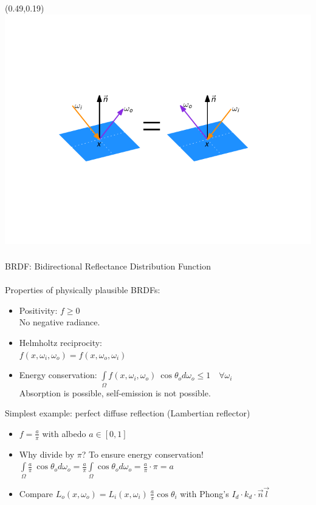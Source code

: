\documentclass[utf8,stillsansserifmath,fleqn,t]{beamer}
\begin{document}
\begin{frame}[label=radiometry-brdf]
\begin{textblock}{0.5}(0.49,0.19)\includegraphics[width=\textwidth]{./fig/helmholtz-reciprocity.pdf}\end{textblock}
\frametitle{\insertsection}
BRDF: Bidirectional Reflectance Distribution Function\\
~\\Properties of physically plausible BRDFs:
\begin{itemize}
\item Positivity: $f \geq 0$\\
No negative radiance.
\item Helmholtz reciprocity:\\
    $f(x,\omega_i,\omega_o) = f(x,\omega_o,\omega_i)$
\item Energy conservation:
    $\int\limits_\Omega
    f(x,\omega_i,\omega_o)~\cos{\theta_o} d\omega_o \le
    1\quad\forall\omega_i$\\
    Absorption is possible, self-emission is not possible.
\end{itemize}
Simplest example: perfect diffuse reflection (Lambertian reflector)
\begin{itemize}
\item $f = \frac{a}{\pi}$ with albedo $a \in [0,1]$
\item Why divide by $\pi$? To ensure energy conservation!\\
$\int\limits_\Omega \frac{a}{\pi}~\cos{\theta_o} d\omega_o = \frac{a}{\pi}
\int\limits_\Omega \cos{\theta_o} d\omega_o = \frac{a}{\pi} \cdot \pi = a$
\item Compare $L_o(x, \omega_o) =
L_i(x,\omega_i)~\frac{a}{\pi}\cos\theta_i$ with Phong's $I_d \cdot k_d \cdot \vec{n}\vec{l}$
\end{itemize}
\end{frame}
\end{document}

